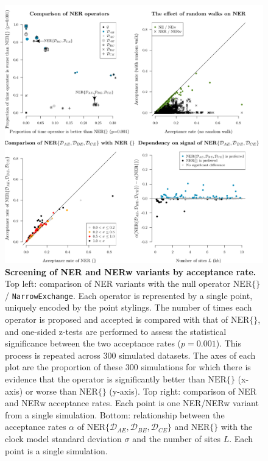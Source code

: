 \documentclass[10pt,letterpaper]{article}
\begin{document}
\begin{figure}[!h]
\includegraphics[width=\textwidth]{Figures/acceptanceRates.pdf}
\caption{\textbf{Screening of NER and NERw variants by acceptance rate.} Top left: comparison of NER variants with the null operator $\text{NER}\{\}$ / \texttt{NarrowExchange}. 
Each operator is represented by a single point, uniquely encoded by the point stylings. 
The number of times each operator is proposed and accepted is compared with that of $\text{NER}\{\}$, and one-sided z-tests are performed to assess the statistical significance between the two acceptance rates ($p = 0.001$).  This process is repeated across $300$ simulated datasets. The axes of each plot are the proportion of these $300$ simulations for which there is evidence that the operator is significantly better than $\text{NER}\{\}$ (x-axis) or worse than $\text{NER}\{\}$ (y-axis). Top right: comparison of NER and NERw acceptance rates. Each point is one NER/NERw variant from a single simulation. Bottom: relationship between the acceptance rates $\alpha$ of $\text{NER}\{\mathcal{D}_{AE}, \mathcal{D}_{BE}, \mathcal{D}_{CE}\}$ and $\text{NER}\{ \}$ with the clock model standard deviation $\sigma$ and the number of sites $L$.  Each point is a single simulation. }
\label{fig:acceptanceRateScreening}
\end{figure}
\end{document}

